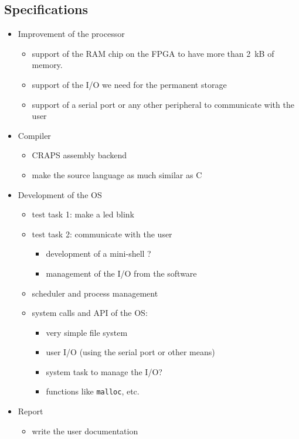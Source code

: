 \documentclass{article}
\begin{document}
  \begin{appendix}
    \section{Specifications}
      \begin{itemize}
        \item Improvement of the processor
          \begin{itemize}
            \item support of the RAM chip on the FPGA to have more than
              \SI{2}{kB} of memory.
            \item support of the I/O we need for the permanent storage
            \item support of a serial port or any other peripheral to
              communicate with the user
          \end{itemize}
        \item Compiler
          \begin{itemize}
            \item CRAPS assembly backend
            \item make the source language as much similar as C
          \end{itemize}
          \item Development of the OS
            \begin{itemize}
              \item test task 1: make a led blink
              \item test task 2: communicate with the user
                \begin{itemize}
                  \item development of a mini-shell ?
                  \item management of the I/O from the software
                \end{itemize}
              \item scheduler and process management
              \item system calls and API of the OS:
                \begin{itemize}
                  \item very simple file system
                  \item user I/O (using the serial port or other means)
                  \item system task to manage the I/O?
                  \item functions like \verb+malloc+, etc.
                \end{itemize}
            \end{itemize}
        \item Report
          \begin{itemize}
            \item write the user documentation
          \end{itemize}
      \end{itemize}
  \end{appendix}
\end{document}
